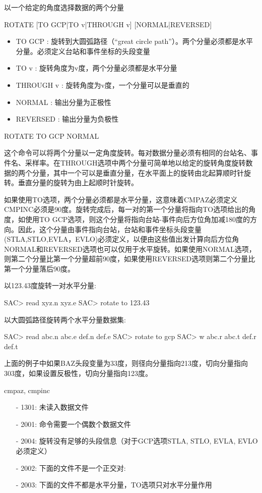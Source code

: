 \label{cmd:rotate}

以一个给定的角度选择数据的两个分量

\begin{SACSTX}
ROTATE [TO GCP|TO v|THROUGH v] [NORMAL|REVERSED]
\end{SACSTX}

\begin{itemize}
\item TO GCP : 旋转到大圆弧路径（``great circle path''）。两个分量必须都是水平分量。必须定义台站和事件坐标的头段变量 
\item TO v : 旋转角度为v度，两个分量必须都是水平分量 
\item THROUGH v : 旋转角度为v度，一个分量可以是垂直的 
\item NORMAL : 输出分量为正极性 
\item REVERSED : 输出分量为负极性 
\end{itemize}

\begin{SACDFT}
ROTATE TO GCP NORMAL
\end{SACDFT}

这个命令可以将两个分量以一定角度旋转。每对数据分量必须有相同的台站名、事件名、采样率。在THROUGH选项中两个分量可简单地以给定的旋转角度旋转数据的两个分量，其中一个可以是垂直分量，在水平面上的旋转由北起算顺时针旋转。垂直分量的旋转为由上起顺时针旋转。

如果使用TO选项，两个分量必须都是水平分量，这意味着CMPAZ必须定义CMPINC必须是90度。旋转完成后，每一对的第一个分量将指向TO选项给出的角度，如使用TO GCP选项，则这个分量将指向台站-事件向后方位角加减180度的方向。因此，这个分量由事件指向台站，台站和事件坐标头段变量(STLA,STLO,EVLA，EVLO)必须定义，以便由这些值出发计算向后方位角NORMAL和REVERSED选项也可以仅用于水平旋转。如果使用NORMAL选项，则第二个分量比第一个分量超前90度，如果使用REVERSED选项则第二个分量比第一个分量落后90度。

以123.43度旋转一对水平分量:
\begin{SACCode}
SAC> read xyz.n xyz.e
SAC> rotate to 123.43
\end{SACCode}

以大圆弧路径旋转两个水平分量数据集:
\begin{SACCode}
SAC> read abc.n abc.e def.n def.e
SAC> rotate to gcp
SAC> w abc.r abc.t def.r def.t
\end{SACCode}
上面的例子中如果BAZ头段变量为33度，则径向分量指向213度，切向分量指向303度，如果设置反极性，切向分量指向123度。

cmpaz, cmpinc

\begin{itemize}
\item[-]1301: 未读入数据文件
\item[-]2001: 命令需要一个偶数个数据文件
\item[-]2004: 旋转没有足够的头段信息（对于GCP选项STLA, STLO, EVLA, EVLO必须定义）
\item[-]2002: 下面的文件不是一个正交对:
\item[-]2003: 下面的文件不都是水平分量，TO选项只对水平分量作用
\end{itemize}
